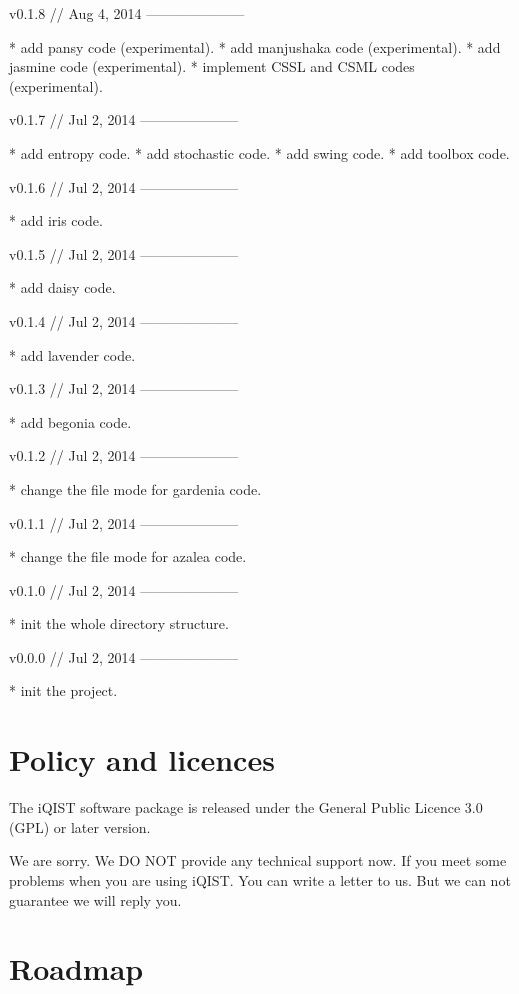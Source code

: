 v0.1.8 // Aug 4, 2014
---------------------

* add pansy code (experimental).
* add manjushaka code (experimental).
* add jasmine code (experimental).
* implement CSSL and CSML codes (experimental).


v0.1.7 // Jul 2, 2014
---------------------

* add entropy code.
* add stochastic code.
* add swing code.
* add toolbox code.


v0.1.6 // Jul 2, 2014
---------------------

* add iris code.


v0.1.5 // Jul 2, 2014
---------------------

* add daisy code.


v0.1.4 // Jul 2, 2014
---------------------

* add lavender code.


v0.1.3 // Jul 2, 2014
---------------------

* add begonia code.


v0.1.2 // Jul 2, 2014
---------------------

* change the file mode for gardenia code.


v0.1.1 // Jul 2, 2014
---------------------

* change the file mode for azalea code.


v0.1.0 // Jul 2, 2014
---------------------

* init the whole directory structure.


v0.0.0 // Jul 2, 2014
---------------------

* init the project.


\section{Policy and licences}

The iQIST software package is released under the General Public Licence
 3.0 (GPL) or later version.

We are sorry. We DO NOT provide any technical support now. If you meet
some problems when you are using iQIST. You can write a letter to us. But
we can not guarantee we will reply you.

\section{Roadmap}

